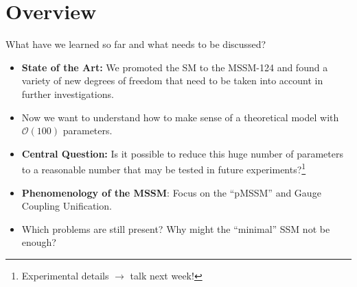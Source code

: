 \section{Overview}
\begin{frame}{What have we learned so far and what needs to be discussed?}
\addtocounter{framenumber}{-1}
\begin{itemize}
	\item \textbf{State of the Art:} We \alert{promoted the SM to the MSSM-124} and found a variety of new degrees of freedom that need to be taken into account in further investigations.\\[1em]
	\item Now we want to understand how to make sense of a theoretical model with $\mathcal{O}(100)$ parameters.\\[1em]
	\item \textbf{Central Question:} Is it possible to reduce this huge number of parameters to a reasonable number that may be tested in future experiments?\footnote{Experimental details $\rightarrow$ talk next week!}\\[1em]
	\item \textbf{Phenomenology of the MSSM}: Focus on the \enquote{pMSSM} and Gauge Coupling Unification.\\[1em]
	\item Which problems are still present? Why might the \enquote{minimal} SSM not be enough?
\end{itemize}
\end{frame}